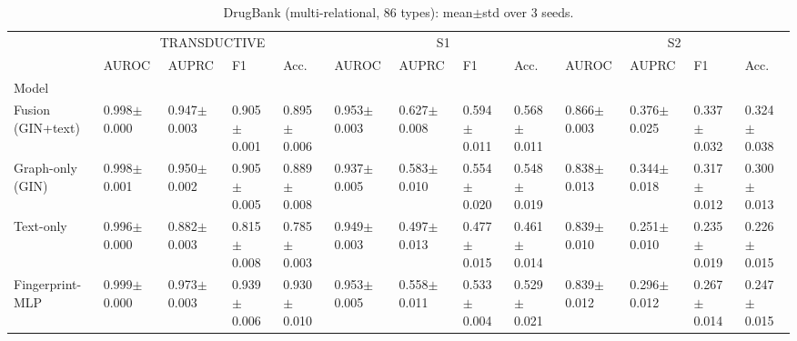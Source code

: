 \begin{table}[t]
\caption{DrugBank (multi-relational, 86 types): mean$\pm$std over 3 seeds.}
\label{tab:main-drugbank}
\begin{tabular}{lllllllllllll}
\toprule
 & \multicolumn{4}{c}{TRANSDUCTIVE} & \multicolumn{4}{c}{S1} & \multicolumn{4}{c}{S2} \\
 & AUROC & AUPRC & F1 & Acc. & AUROC & AUPRC & F1 & Acc. & AUROC & AUPRC & F1 & Acc. \\
Model &  &  &  &  &  &  &  &  &  &  &  &  \\
\midrule
Fusion (GIN+text) & 0.998$\pm$0.000 & 0.947$\pm$0.003 & 0.905$\pm$0.001 & 0.895$\pm$0.006 & 0.953$\pm$0.003 & 0.627$\pm$0.008 & 0.594$\pm$0.011 & 0.568$\pm$0.011 & 0.866$\pm$0.003 & 0.376$\pm$0.025 & 0.337$\pm$0.032 & 0.324$\pm$0.038 \\
Graph-only (GIN) & 0.998$\pm$0.001 & 0.950$\pm$0.002 & 0.905$\pm$0.005 & 0.889$\pm$0.008 & 0.937$\pm$0.005 & 0.583$\pm$0.010 & 0.554$\pm$0.020 & 0.548$\pm$0.019 & 0.838$\pm$0.013 & 0.344$\pm$0.018 & 0.317$\pm$0.012 & 0.300$\pm$0.013 \\
Text-only & 0.996$\pm$0.000 & 0.882$\pm$0.003 & 0.815$\pm$0.008 & 0.785$\pm$0.003 & 0.949$\pm$0.003 & 0.497$\pm$0.013 & 0.477$\pm$0.015 & 0.461$\pm$0.014 & 0.839$\pm$0.010 & 0.251$\pm$0.010 & 0.235$\pm$0.019 & 0.226$\pm$0.015 \\
Fingerprint-MLP & 0.999$\pm$0.000 & 0.973$\pm$0.003 & 0.939$\pm$0.006 & 0.930$\pm$0.010 & 0.953$\pm$0.005 & 0.558$\pm$0.011 & 0.533$\pm$0.004 & 0.529$\pm$0.021 & 0.839$\pm$0.012 & 0.296$\pm$0.012 & 0.267$\pm$0.014 & 0.247$\pm$0.015 \\
\bottomrule
\end{tabular}
\end{table}
